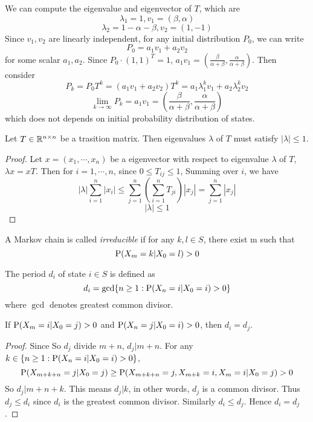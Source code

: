 We can compute the eigenvalue and eigenvector of $T$, which are 
$$\lambda_1 = 1, v_1=\left(\beta, \alpha \right)$$
$$\lambda_2 = 1-\alpha-\beta, v_2=\left(1, -1 \right)$$
Since $v_1,v_2$ are linearly independent, for any initial distribution $P_0$, we can write
$$P_0 = a_1v_1+a_2v_2$$
for some scalar $a_1,a_2$. Since $P_0 \cdot (1,1)^T = 1$, $a_1v_1=\left(\frac{\beta}{\alpha+\beta}, \frac{\alpha}{\alpha+\beta} \right) $.
Then consider
$$P_k = P_0T^k = (a_1v_1+a_2v_2)T^k = a_1 \lambda_1^k v_1+a_2 \lambda_2^k v_2$$
$$\lim_{k\to \infty} P_k = a_1v_1 = \left(\frac{\beta}{\alpha+\beta}, \frac{\alpha}{\alpha+\beta} \right)$$
which does not depends on initial probability distribution of states.

\begin{lemma}
	Let $T\in \Real^{n\times n}$ be a trasition matrix. Then eigenvalues $\lambda$ of $T$ must satisfy $|\lambda | \leq 1$.
\end{lemma}
\begin{proof}
	Let $x=(x_1,\cdots, x_n)$ be a eigenvector with respect to eigenvalue $\lambda$ of $T$, $\lambda x = xT$. Then for $i=1, \cdots, n$, since $0\leq T_{ij} \leq 1$,
	Summing over $i$, we have
	$$	|\lambda| \sum_{i=1}^n |x_i| \leq \sum_{j=1}^n \left( \sum_{i=1}^n T_{ji} \right) |x_j| = \sum_{j=1}^n |x_j|$$
	$$ |\lambda| \leq 1$$
\end{proof}

A Markov chain is called \textit{irreducible} if for any $k,l\in S$, there exist m such that
$$\P(X_m=k |X_0=l)>0$$

The period $d_i$ of state $i\in S$ is defined as
$$d_i = \gcd\{n\geq 1: \P(X_n=i | X_0 = i) >0\}$$
where $\gcd$ denotes greatest common divisor.

\begin{lemma}
	If $\P(X_m = i | X_0 = j) >0$ and $\P(X_n = j | X_0=i)>0$, then $d_i = d_j$.
\end{lemma}
\begin{proof}
	Since 
	So $d_j$ divide $m+n$, $d_j|m+n$. For any $k \in \{n\geq 1: \P(X_n=i | X_0 = i) >0\}$,
	$$\P(X_{m+k+n} = j | X_0=j) \geq \P(X_{m+k+n} = j, X_{m+k} =i, X_m=i | X_0=j) >0$$
	So $d_j|m+n+k$. This means $d_j|k$, in other words, $d_j$ is a common divisor. Thus $d_j\leq d_i$ since $d_i$ is the greatest common divisor. Similarly $d_i\leq d_j$. Hence $d_i = d_j$.
\end{proof}

